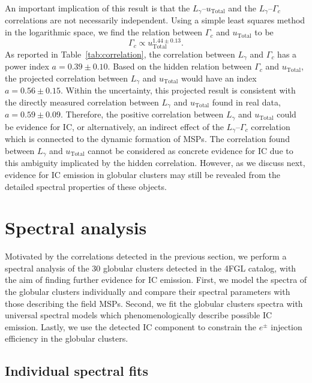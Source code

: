 \documentclass[doublespace,nopageskip]{VTthesis}
\begin{document}
An important implication of this result is that the $L_\gamma$--$u_\mathrm{Total}$ and the $L_\gamma$--$\Gamma_c$ correlations are not necessarily independent. Using a simple least squares method in the logarithmic space, we find the relation between $\Gamma_c$ and $u_\mathrm{Total}$ to be
\begin{equation}
    \Gamma_c \propto u_\mathrm{Total}^{1.44 \pm 0.13}.
\end{equation}
As reported in Table~\ref{tab:correlation}, the correlation between $L_\gamma$ and $\Gamma_c$ has a power index $a=0.39 \pm 0.10$. Based on the hidden relation between $\Gamma_c$ and $u_\mathrm{Total}$, the projected correlation between $L_\gamma$ and $u_\mathrm{Total}$ would have an index $a = 0.56 \pm 0.15$. Within the uncertainty, this projected result is consistent with the directly measured correlation between $L_\gamma$ and $u_\mathrm{Total}$ found in real data, $a = 0.59 \pm 0.09$. Therefore, the positive correlation between $L_\gamma$ and $u_\mathrm{Total}$ could be evidence for IC, or alternatively, an indirect effect of the $L_\gamma$--$\Gamma_c$ correlation which is connected to the dynamic formation of MSPs. The correlation found between $L_\gamma$ and $u_\mathrm{Total}$ cannot be considered as concrete evidence for IC due to this ambiguity implicated by the hidden correlation. However, as we discuss next, evidence for IC emission in globular clusters may still be revealed from the detailed spectral properties of these objects.

\section{Spectral analysis}\label{sec:spectra}

Motivated by the correlations detected in the previous section, we perform a spectral analysis of the 30 globular clusters detected in the 4FGL catalog, with the aim of finding further evidence for IC emission. First, we model the spectra of the globular clusters individually and compare their spectral parameters with those describing the field MSPs. Second, we fit the globular clusters spectra with universal spectral models which phenomenologically describe possible IC emission. Lastly, we use the detected IC component to constrain the $e^\pm$ injection efficiency in the globular clusters.

\subsection{Individual spectral fits}\label{sec:spectra_individual}
\end{document}
